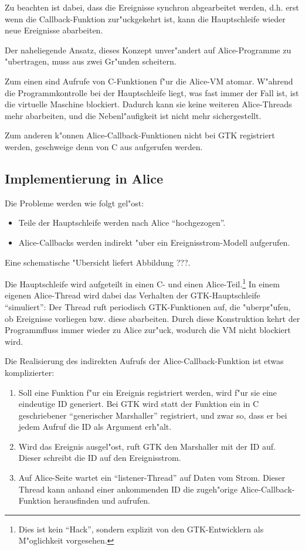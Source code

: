 \documentclass{article}
\begin{document}
Zu beachten ist dabei, dass die Ereignisse synchron abgearbeitet werden,
d.h. erst wenn die Callback-Funktion zur"uckgekehrt ist, kann die Hauptschleife
wieder neue Ereignisse abarbeiten.

Der naheliegende Ansatz, dieses Konzept unver"andert auf Alice-Programme
zu "ubertragen, muss aus zwei Gr"unden scheitern.
 
Zum einen sind Aufrufe von C-Funktionen f"ur die Alice-VM atomar. W"ahrend die
Programmkontrolle bei der Hauptschleife liegt, was fast immer der Fall ist,
ist die virtuelle Maschine blockiert. Dadurch kann sie keine weiteren
Alice-Threads mehr abarbeiten, und die Nebenl"aufigkeit ist nicht mehr
sichergestellt.

Zum anderen k"onnen Alice-Callback-Funktionen nicht bei GTK registriert werden,
geschweige denn von C aus aufgerufen werden.

\subsection{Implementierung in Alice}

Die Probleme werden wie folgt gel"ost:

\begin{itemize}
\item Teile der Hauptschleife werden nach Alice ``hochgezogen''.
\item Alice-Callbacks werden indirekt "uber ein Ereignisstrom-Modell
      aufgerufen.
\end{itemize}

Eine schematische "Ubersicht liefert Abbildung ???.

Die Hauptschleife wird aufgeteilt in einen C- und einen Alice-Teil.\footnote{
Dies ist kein ``Hack'', sondern explizit von den GTK-Entwicklern als
M"oglichkeit vorgesehen.}
In einem eigenen Alice-Thread wird dabei das Verhalten
der GTK-Hauptschleife ``simuliert'': Der Thread ruft periodisch
GTK-Funktionen auf, die "uberpr"ufen, ob Ereignisse vorliegen bzw. diese
abarbeiten. Durch diese Konstruktion kehrt der Programmfluss immer wieder
zu Alice zur"uck, wodurch die VM nicht blockiert wird.

Die Realisierung des indirekten Aufrufs der Alice-Callback-Funktion 
ist etwas komplizierter:

\begin{enumerate}
\item Soll eine Funktion f"ur ein Ereignis registriert werden,
      wird f"ur sie eine eindeutige ID generiert. 
      Bei GTK wird statt der Funktion ein in C geschriebener
      ``generischer Marshaller'' registriert, und zwar so, dass er bei jedem
      Aufruf die ID als Argument erh"alt.
\item Wird das Ereignis ausgel"ost, ruft GTK den Marshaller mit der ID auf.
      Dieser schreibt die ID auf den Ereignisstrom.
\item Auf Alice-Seite wartet ein ``listener-Thread'' auf Daten vom Strom.
      Dieser Thread kann anhand einer ankommenden ID die zugeh"orige
      Alice-Callback-Funktion herausfinden und aufrufen.
\end{enumerate}
\end{document}
